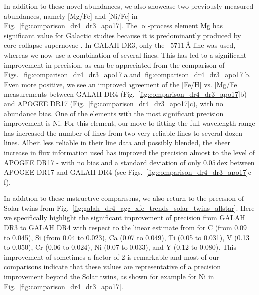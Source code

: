 \documentclass[
  journal=pasa,
  manuscript=research-paper, %
  year=2024,
  volume=37
]{cup-journal}
\newcommand\ion[2]{\text{#1\,\textsc{\lowercase{#2}}}}	%
\begin{document}
In addition to these novel abundances, we also showcase two previously measured abundances, namely [Mg/Fe] and [Ni/Fe] in Fig.~\ref{fig:comparison_dr4_dr3_apo17}. The $\upalpha$-process element Mg has significant value for Galactic studies because it is predominantly produced by core-collapse supernovae \citep{Kobayashi2020}. In GALAH DR3, only the \ion{Mg}{i}~$5711\,\text{\AA}$ line was used, whereas we now use a combination of several lines. This has led to a significant improvement in precision, as can be appreciated from the comparison of Figs.~\ref{fig:comparison_dr4_dr3_apo17}a and \ref{fig:comparison_dr4_dr3_apo17}b. Even more positive, we see an improved agreement of the [Fe/H] vs. [Mg/Fe] measurements between GALAH DR4 (Fig.~\ref{fig:comparison_dr4_dr3_apo17}b) and APOGEE DR17 (Fig.~\ref{fig:comparison_dr4_dr3_apo17}c), with no abundance bias. One of the elements with the most significant precision improvement is Ni. For this element, our move to fitting the full wavelength range has increased the number of lines from two very reliable lines to several dozen lines. Albeit less reliable in their line data and possibly blended, the sheer increase in flux information used has improved the precision almost to the level of APOGEE DR17 - with no bias and a standard deviation of only $0.05\,\mathrm{dex}$ between APOGEE DR17 and GALAH DR4 (see Figs.~\ref{fig:comparison_dr4_dr3_apo17}c-f).

In addition to these instructive comparisons, we also return to the precision of Solar twins from Fig.~\ref{fig:galah_dr4_age_xfe_trends_solar_twins_allstar}. Here we specifically highlight the significant improvement of precision from GALAH DR3 to GALAH DR4 with respect to the linear estimate from \citet{Bedell2018} for C (from 0.09 to 0.045), Si (from 0.04 to 0.023), Ca (0.07 to 0.049), Ti (0.05 to 0.031), V (0.13 to 0.050), Cr (0.06 to 0.024), Ni (0.07 to 0.033), and Y (0.12 to 0.080). This improvement of sometimes a factor of 2 is remarkable and most of our comparisons indicate that these values are representative of a precision improvement beyond the Solar twins, as shown for example for Ni in Fig.~\ref{fig:comparison_dr4_dr3_apo17}.
\end{document}
